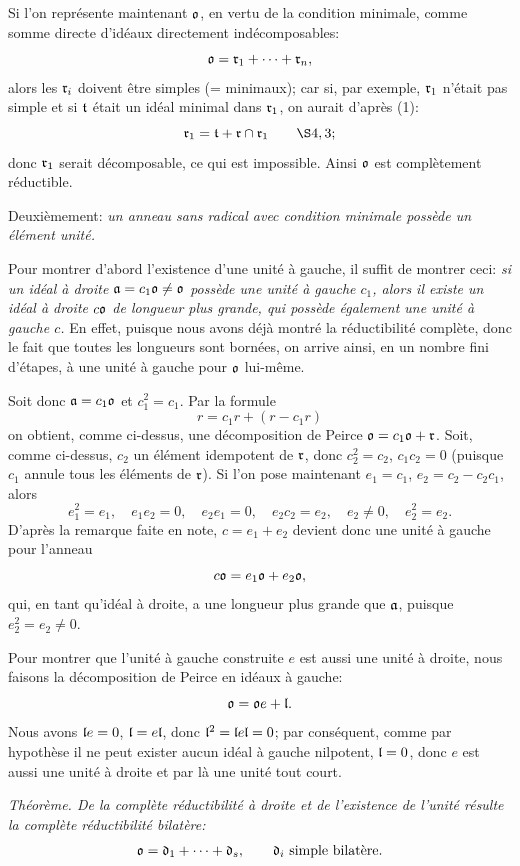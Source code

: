 Si l'on représente maintenant $\mathfrak{o}$, en vertu de la condition minimale, comme somme directe d'idéaux directement indécomposables:
\[
        \mathfrak{o}=\mathfrak{r}_1+\cdots+\mathfrak{r}_n,
\]
alors les $\mathfrak{r}_i$ doivent être simples (= minimaux); car si, par exemple, $\mathfrak{r}_1$ n'était pas simple et si $\mathfrak{t}$ était un idéal minimal dans $\mathfrak{r}_1$, on aurait d'après (1):
\[
        \mr_1=\mt+\mr\cap\mr_1 \qquad \hbox{\(\S 4,3\)};
\]
donc $\mathfrak{r}_1$ serait décomposable, ce qui est impossible. Ainsi $\mathfrak{o}$ est complètement réductible.

Deuxièmement: \emph{un anneau sans radical avec condition minimale possède un élément unité.}

Pour montrer d'abord l'existence d'une unité à gauche, il suffit de montrer ceci: \emph{si un idéal à droite $\mathfrak{a}=c_1\mathfrak{o}\ne\mathfrak{o}$ possède une unité à gauche $c_1$, alors il existe un idéal à droite $c\mathfrak{o}$ de longueur plus grande, qui possède également une unité à gauche $c$.} En effet, puisque nous avons déjà montré la réductibilité complète, donc le fait que toutes les longueurs sont bornées, on arrive ainsi, en un nombre fini d'étapes, à une unité à gauche pour $\mathfrak{o}$ lui-même.

Soit donc $\mathfrak{a}=c_1\mathfrak{o}$ et $c_1^2=c_1$. Par la formule
\[
        r=c_1r+(r-c_1r)
\]
on obtient, comme ci-dessus, une décomposition de Peirce $\mathfrak{o}=c_1\mathfrak{o}+\mathfrak{r}$. Soit, comme ci-dessus, $c_2$ un élément idempotent de $\mathfrak{r}$, donc $c_2^2=c_2$, $c_1c_2=0$ (puisque $c_1$ annule tous les éléments de $\mathfrak{r}$). Si l'on pose maintenant $e_1=c_1$, $e_2=c_2-c_2c_1$, alors
\[
        e_1^2=e_1,
        \quad e_1e_2=0,
        \quad e_2e_1=0,
        \quad e_2c_2=e_2,
        \quad e_2\ne0,
        \quad e_2^2=e_2.
\]
D'après la remarque faite en note, $c=e_1+e_2$ devient donc une unité à gauche pour l'anneau
\[
        c\mathfrak{o}=e_1\mathfrak{o}+e_2\mathfrak{o},
\]
qui, en tant qu'idéal à droite, a une longueur plus grande que $\mathfrak{a}$, puisque $e_2^2=e_2\ne0$.

Pour montrer que l'unité à gauche construite $e$ est aussi une unité à droite, nous faisons la décomposition de Peirce en idéaux à gauche:
\[
        \mathfrak{o}=\mathfrak{o} e+\mathfrak{l}.
\]
Nous avons $\mathfrak{l} e=0$, $\mathfrak{l}=e\mathfrak{l}$, donc $\mathfrak{l}^2=\mathfrak{l} e\mathfrak{l}=0$; par conséquent, comme par hypothèse il ne peut exister aucun idéal à gauche nilpotent, $\mathfrak{l}=0$, donc $e$ est aussi une unité à droite et par là une unité tout court.

\emph{Théorème. De la complète réductibilité à droite et de l'existence de l'unité résulte la complète réductibilité bilatère:}
\[
        \mathfrak{o}=\mathfrak{d}_1+\cdots+\mathfrak{d}_s,
        \qquad \mathfrak{d}_i \hbox{ simple bilatère.}
\]

